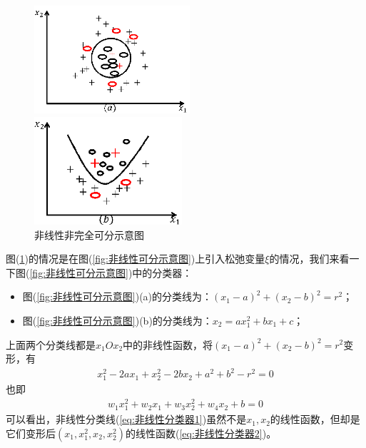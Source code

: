 		\begin{figure}[H]
		\centering
		\begin{varwidth}[t]{\textwidth}
		\vspace{0pt}
		\includegraphics[height=4cm]{images/Nonlinear_nocomplete_classify1.jpg}
		\end{varwidth}
		\qquad \qquad
		\begin{varwidth}[t]{\textwidth}
		\vspace{0pt}
		\includegraphics[height=4cm]{images/Nonlinear_nocomplete_classify2.jpg}
		\end{varwidth}
		\caption{非线性非完全可分示意图}
		\label{fig:非线性非完全可分示意图}
		\end{figure}
	图(\ref{fig:非线性非完全可分示意图})的情况是在图(\ref{fig:非线性可分示意图})上引入松弛变量$\xi$的情况，我们来看一下图(\ref{fig:非线性可分示意图})中的分类器：
	\begin{itemize}
	  \item 图(\ref{fig:非线性可分示意图})(a)的分类线为：$(x_1-a)^2+(x_2-b)^2=r^2$；
	  \item 图(\ref{fig:非线性可分示意图})(b)的分类线为：$x_2=ax_1^2+bx_1+c$；
	\end{itemize}
	\par
	上面两个分类线都是$x_1Ox_2$中的非线性函数，将$(x_1-a)^2+(x_2-b)^2=r^2$变形，有
	\begin{align}\label{eq:非线性分类器1}
	x_1^2-2ax_1+x_2^2-2bx_2+a^2+b^2-r^2=0
	\end{align}
	也即
	\begin{align}\label{eq:非线性分类器2}
	w_1x_1^2+w_2x_1+w_3x_2^2+w_4x_2+b=0
	\end{align}
	可以看出，非线性分类线(\ref{eq:非线性分类器1})虽然不是$x_1,x_2$的线性函数，但却是它们变形后$(x_1,x_1^2,x_2,x_2^2)$的线性函数(\ref{eq:非线性分类器2})。
